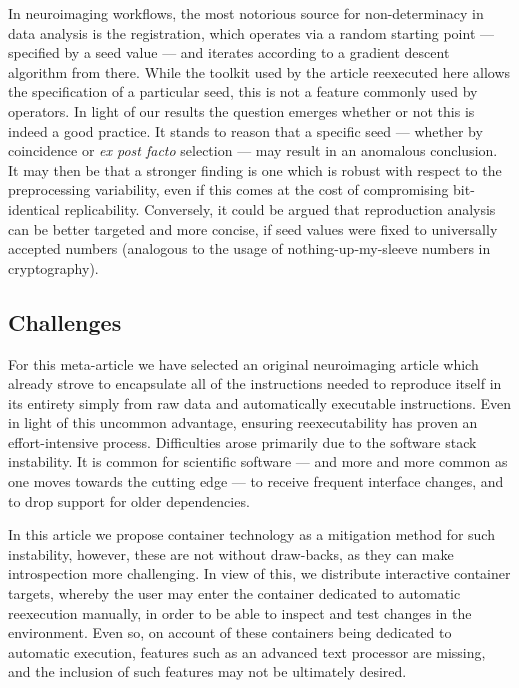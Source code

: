 In neuroimaging workflows, the most notorious source for non-determinacy in data analysis is the registration, which operates via a random starting point — specified by a seed value — and iterates according to a gradient descent algorithm from there.
While the toolkit used by the article reexecuted here allows the specification of a particular seed, this is not a feature commonly used by operators.
In light of our results the question emerges whether or not this is indeed a good practice.
It stands to reason that a specific seed — whether by coincidence or \textit{ex post facto} selection — may result in an anomalous conclusion.
It may then be that a stronger finding is one which is robust with respect to the preprocessing variability, even if this comes at the cost of compromising bit-identical replicability.
Conversely, it could be argued that reproduction analysis can be better targeted and more concise, if seed values were fixed to universally accepted numbers (analogous to the usage of nothing-up-my-sleeve numbers in cryptography).

\subsection{Challenges}
For this meta-article we have selected an original neuroimaging article which already strove to encapsulate all of the instructions needed to reproduce itself in its entirety simply from raw data and automatically executable instructions.
Even in light of this uncommon advantage, ensuring reexecutability has proven an effort-intensive process.
Difficulties arose primarily due to the software stack instability.
It is common for scientific software — and more and more common as one moves towards the cutting edge — to receive frequent interface changes, and to drop support for older dependencies.

In this article we propose container technology as a mitigation method for such instability, however, these are not without draw-backs, as they can make introspection more challenging.
In view of this, we distribute interactive container targets, whereby the user may enter the container dedicated to automatic reexecution manually, in order to be able to inspect and test changes in the environment.
Even so, on account of these containers being dedicated to automatic execution, features such as an advanced text processor are missing, and the inclusion of such features may not be ultimately desired.


